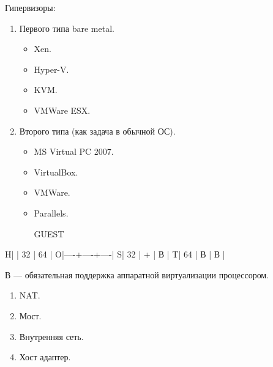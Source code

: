 \documentclass[12pt, russian, oneside, article]{ncc}
\begin{document}
Гипервизоры:
\begin{enumerate}
\item Первого типа bare metal.

\begin{itemize}
\item Xen.
\item Hyper-V.
\item KVM.
\item VMWare ESX.
\end{itemize}

\item Второго типа (как задача в обычной ОС).

\begin{itemize}
\item MS Virtual PC 2007.
\item VirtualBox.
\item VMWare.
\item Parallels.

       GUEST
\end{itemize}

\end{enumerate}
H|    | 32 | 64 |
O|----+----+----|
S| 32 |  + |  В |
T| 64 |  В |  В |

В --- обязательная поддержка аппаратной виртуализации процессором.

\begin{enumerate}
\item NAT.
\item Мост.
\item Внутренняя сеть.
\item Хост адаптер.
\end{enumerate}
\end{document}
